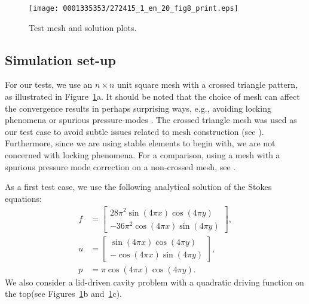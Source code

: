 \begin{figure}[!t]
\texttt{[image: 0001335353/272415\_1\_en\_20\_fig8\_print.eps]}
\caption{Test mesh and solution plots.}
\label{fig:terrel:meshsolution}\vspace*{-3pt}
\end{figure}



\subsection{Simulation set-up}

For our tests, we use an $n \times n$ unit square mesh with a crossed
triangle pattern, as illustrated in Figure~\ref{fig:terrel:meshsolution}a. It
should be noted that the choice of mesh can affect the convergence
results in perhaps surprising ways, e.g., avoiding locking
phenomena \citep{NagtegaalDeJong1974} or spurious pressure-modes
\citep{Malkus2000}. The crossed triangle mesh was used as our
test case to avoid subtle issues related to mesh construction (see
\citet[Proposition~6.1, Section~VI.6]{BrezziFortin1991}). Furthermore,
since we are using stable elements to begin with, we are not
concerned with locking phenomena. For a comparison, using a mesh
with a spurious pressure mode correction on a non-crossed mesh, see
\citet{TerrelScott2008}.

As a first test case, we use the following analytical solution of the
Stokes equations:
%
\begin{align}
\label{eqn:terrel:testcase}
  f &=
    \begin{bmatrix}
      28\pi^2\sin(4\pi x)\cos(4\pi y)
      \\
      -36\pi^2\cos(4\pi x)\sin(4\pi y)
    \end{bmatrix},
\\
  u &=
  \begin{bmatrix}
    \sin(4\pi x)\cos(4\pi y)
      \\
     -\cos(4\pi x)\sin(4\pi y)
   \end{bmatrix},
\\
  p &= \pi\cos(4\pi x)\cos(4\pi y).
\end{align}
%
We also consider a lid-driven cavity problem with a quadratic
driving function on the top\break (see Figures~\ref{fig:terrel:meshsolution}b
and~\ref{fig:terrel:meshsolution}c).

